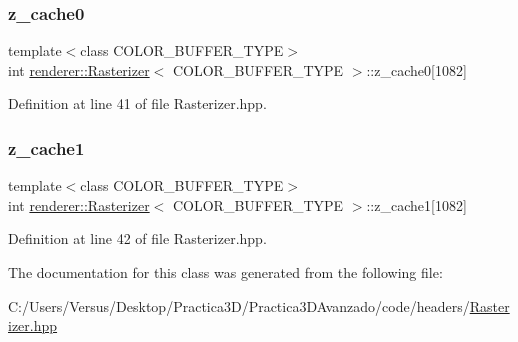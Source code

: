 \subsubsection{\texorpdfstring{z\_cache0}{z\_cache0}}
{\footnotesize\ttfamily template$<$class C\+O\+L\+O\+R\+\_\+\+B\+U\+F\+F\+E\+R\+\_\+\+T\+Y\+PE$>$ \\
int \mbox{\hyperlink{classrenderer_1_1_rasterizer}{renderer\+::\+Rasterizer}}$<$ C\+O\+L\+O\+R\+\_\+\+B\+U\+F\+F\+E\+R\+\_\+\+T\+Y\+PE $>$\+::z\+\_\+cache0\mbox{[}1082\mbox{]}\hspace{0.3cm}{\ttfamily [private]}}



Definition at line 41 of file Rasterizer.\+hpp.

\mbox{\label{classrenderer_1_1_rasterizer_a6c6b512ee02cc0269ef2e520a562c265}} 
\subsubsection{\texorpdfstring{z\_cache1}{z\_cache1}}
{\footnotesize\ttfamily template$<$class C\+O\+L\+O\+R\+\_\+\+B\+U\+F\+F\+E\+R\+\_\+\+T\+Y\+PE$>$ \\
int \mbox{\hyperlink{classrenderer_1_1_rasterizer}{renderer\+::\+Rasterizer}}$<$ C\+O\+L\+O\+R\+\_\+\+B\+U\+F\+F\+E\+R\+\_\+\+T\+Y\+PE $>$\+::z\+\_\+cache1\mbox{[}1082\mbox{]}\hspace{0.3cm}{\ttfamily [private]}}



Definition at line 42 of file Rasterizer.\+hpp.



The documentation for this class was generated from the following file\+:\begin{DoxyCompactItemize}
\item 
C\+:/\+Users/\+Versus/\+Desktop/\+Practica3\+D/\+Practica3\+D\+Avanzado/code/headers/\mbox{\hyperlink{_rasterizer_8hpp}{Rasterizer.\+hpp}}\end{DoxyCompactItemize}
